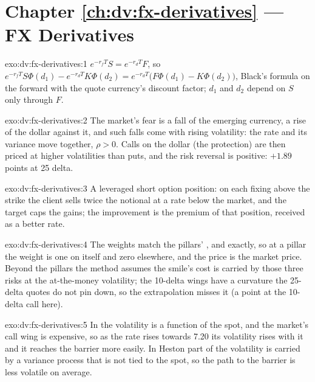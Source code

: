 \section*{Chapter \ref{ch:dv:fx-derivatives} --- FX Derivatives}

\begin{solution}{exo:dv:fx-derivatives:1}
$e^{-r_fT}S=e^{-r_dT}F$, so $e^{-r_fT}S\Phi(d_1)-e^{-r_dT}K\Phi(d_2)=e^{-r_dT}\bigl(F\Phi(d_1)-K\Phi(d_2)\bigr)$, Black's formula on the forward with
the quote currency's discount factor; $d_1$ and $d_2$ depend on $S$ only through $F$.
\end{solution}

\begin{solution}{exo:dv:fx-derivatives:2}
The market's fear is a fall of the emerging currency, a rise of the dollar against it, and such falls come with rising volatility: the rate and its
variance move together, $\rho>0$. Calls on the dollar (the protection) are then priced at higher volatilities than puts, and the risk reversal is
positive: $+1.89$ points at 25 delta.
\end{solution}

\begin{solution}{exo:dv:fx-derivatives:3}
A leveraged short option position: on each fixing above the strike the client sells twice the notional at a rate below the market, and the target caps
the gains; the improvement is the premium of that position, received as a better rate.
\end{solution}

\begin{solution}{exo:dv:fx-derivatives:4}
The weights match the pillars' ,  and  exactly, so at a pillar the weight is one on itself and zero elsewhere, and the price is the market
price. Beyond the pillars the method assumes the smile's cost is carried by those three risks at the at-the-money volatility; the 10-delta wings have a
curvature the 25-delta quotes do not pin down, so the extrapolation misses it (a point at the 10-delta call here).
\end{solution}

\begin{solution}{exo:dv:fx-derivatives:5}
In  the volatility is a function of the spot, and the market's call wing is expensive, so as the rate rises towards 7.20 its volatility
rises with it and it reaches the barrier more easily. In Heston part of the volatility is carried by a variance process that is not tied to the spot, so
the path to the barrier is less volatile on average.
\end{solution}


